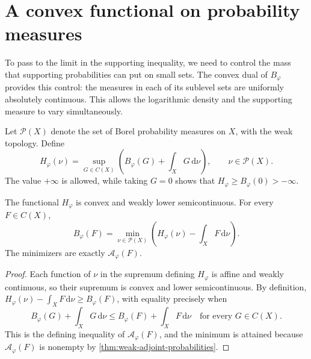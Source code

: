 \section{A convex functional on probability measures}\label{sec:normalization-dual}

To pass to the limit in the supporting inequality, we need to control the mass that supporting probabilities can put on small sets. The convex dual of $B_\varphi$ provides this control: the measures in each of its sublevel sets are uniformly absolutely continuous. This allows the logarithmic density and the supporting measure to vary simultaneously.

Let $\mathcal P(X)$ denote the set of Borel probability measures on $X$, with the weak topology. Define
\begin{equation}\label{eq:normalization-dual-definition}
 H_\varphi(\nu)
 =\sup_{G\in C(X)}\left(B_\varphi(G)+\int_XG\,\mathrm{d}\nu\right),
 \qquad \nu\in\mathcal P(X).
\end{equation}
The value $+\infty$ is allowed, while taking $G=0$ shows that
$H_\varphi\geq B_\varphi(0)>-\infty$.

\begin{proposition}\label{prop:normalization-dual}
The functional $H_\varphi$ is convex and weakly lower semicontinuous. For every $F\in C(X)$,
\begin{equation}\label{eq:normalization-dual-minimum}
 B_\varphi(F)
 =\min_{\nu\in\mathcal P(X)}
       \left(H_\varphi(\nu)-\int_XF\,\mathrm{d}\nu\right).
\end{equation}
The minimizers are exactly $\mathcal A_\varphi(F)$.
\end{proposition}
\begin{proof}
Each function of $\nu$ in the supremum defining $H_\varphi$ is affine and weakly continuous, so their supremum is convex and lower semicontinuous. By definition,
$H_\varphi(\nu)-\int_XF\,\mathrm{d}\nu\geq B_\varphi(F)$, with equality precisely when
\[
 B_\varphi(G)+\int_XG\,\mathrm{d}\nu
 \leq B_\varphi(F)+\int_XF\,\mathrm{d}\nu
 \quad\text{for every }G\in C(X).
\]
This is the defining inequality of $\mathcal A_\varphi(F)$, and the minimum is attained because $\mathcal A_\varphi(F)$ is nonempty by \cref{thm:weak-adjoint-probabilities}.
\end{proof}

